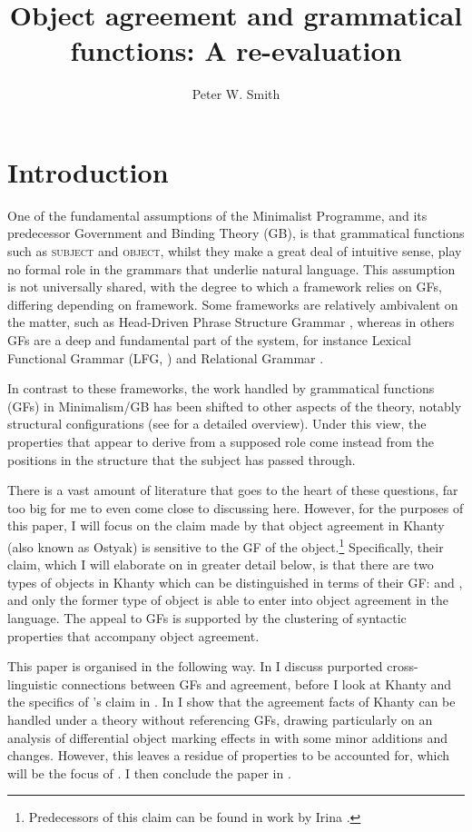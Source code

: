 \documentclass[output=paper
,modfonts
,nonflat]{langsci/langscibook}
\title{Object agreement and grammatical functions: A re-evaluation}
\author{Peter W. Smith\affiliation{Goethe-Universität Frankfurt am Main}}
\begin{document}
\maketitle

\section{Introduction} 

One of the fundamental assumptions of the Minimalist Programme, and its predecessor Government and Binding Theory (GB), is that grammatical functions such as \textsc{subject} and \textsc{object}, whilst they make a great deal of intuitive sense, play no formal role in the grammars that underlie natural language.
This assumption is not universally shared, with the degree to which a framework relies on GFs, differing depending on framework.
Some frameworks are relatively ambivalent on the matter, such as Head-Driven Phrase Structure Grammar \citep{pollardsag1994}, whereas in others GFs are a deep and fundamental part of the system, for instance Lexical Functional Grammar (LFG, \citealt{dalrymple2001}) and Relational Grammar \citep{perlmutterpostal1983}. 

In contrast to these frameworks, the work handled by grammatical functions (GFs) in Minimalism/GB has been shifted to other aspects of the theory, notably structural configurations (see \citealt{mccloskey1997} for a detailed overview).
Under this view, the properties that appear to derive from a supposed \subj{} role come instead from the positions in the structure that the subject has passed through.

There is a vast amount of literature that goes to the heart of these questions, far too big for me to even come close to discussing here. However, for the purposes of this paper, I will focus on the claim made by \citet{dn2011} that object agreement in Khanty (also known as Ostyak) is sensitive to the GF of the object.\footnote{Predecessors of this claim can be found in work by Irina \citet{nikolaeva1999,ostyakgrammar,nikolaeva2001}.} 
Specifically, their claim, which I will elaborate on in greater detail below, is that there are two types of objects in Khanty which can be distinguished in terms of their GF: \object{} and \robj, and only the former type of object is able to enter into object agreement in the language.
The appeal to GFs is supported by the clustering of syntactic properties that accompany object agreement.

This paper is organised in the following way. In  I discuss purported cross-linguistic connections between GFs and agreement, before I look at Khanty and the specifics of \citet{dn2011}'s claim in .
In  I show that the agreement facts of Khanty can be handled under a theory without referencing GFs, drawing particularly on an analysis of differential object marking effects in \citet{Baker2015} with some minor additions and changes.
However, this leaves a residue of properties to be accounted for, which will be the focus of .
I then conclude the paper in .
\end{document}
